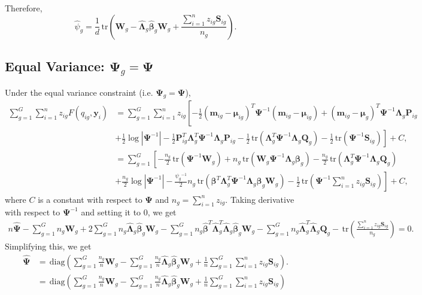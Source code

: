 \documentclass[12pt]{article}
\newcommand{\bP}{\mathbf{P}}
\newcommand{\bQ}{\mathbf{Q}}
\newcommand{\bW}{\mathbf{W}}
\newcommand{\bmm}{\mathbf{m}}
\newcommand{\by}{\mathbf{y}}
\newcommand{\bbeta}{\boldsymbol{\beta}}
\newcommand{\bmu}{\boldsymbol{\mu}}
\newcommand{\bLambda}{\boldsymbol{\Lambda}}
\newcommand{\bPsi}{\boldsymbol{\Psi}}
\newcommand{\tr}{\,\mbox{tr}}
\newcommand{\diag}{\,\mbox{diag}}
\begin{document}
Therefore,
\begin{equation}
\hat{\psi}_g=\frac{1}{d}\tr\left(\bW_g-\hat{\bLambda}_g\hat{\bbeta}_g\bW_g+\frac{\sum_{i=1}^nz_{ig}\mathbf{S}_{ig}}{n_g}\right).
\end{equation}

\subsection{Equal Variance: $\bPsi_g = \bPsi$}
Under the equal variance constraint (i.e. $\bPsi_g = \bPsi$),
\begin{align*}
\sum_{g=1}^G\sum_{i=1}^nz_{ig}F(q_{ig},\by_i)&=\sum_{g=1}^G\sum_{i=1}^nz_{ig}\left[-\frac{1}{2}(\bmm_{ig}-\bmu_{ig})^T\bPsi^{-1}(\bmm_{ig}-\bmu_{ig})+(\bmm_{ig}-\bmu_g)^T\bPsi^{-1}\bLambda_g\bP_{ig}  \right.\\
&\left.+\frac{1}{2} \log |\bPsi^{-1}|-\frac{1}{2}\bP_{ig}^T\bLambda_g^T\bPsi^{-1}\bLambda_g\bP_{ig}-\frac{1}{2}\tr(\bLambda_g^T\bPsi^{-1}\bLambda_g\bQ_{g})-\frac{1}{2}\tr\left(\bPsi^{-1}\mathbf{S}_{ig}\right)  \right]+C,\\[3pt]
&=\sum_{g=1}^G\left[-\frac{n_g}{2}\tr(\bPsi^{-1}\bW_{g})+n_g\tr(\bW_g\bPsi^{-1}\bLambda_g\bbeta_g)-\frac{n_g}{2}\tr(\bLambda_g^T\bPsi^{-1}\bLambda_g\bQ_{g})\right.\\
&\left.+\frac{n_g}{2}\log |\bPsi^{-1}|-\frac{\psi_g{^{-1}}}{2}n_g\tr(\bbeta^T\bLambda_g^T\bPsi^{-1}\bLambda_g\bbeta_g\bW_g)-\frac{1}{2}\tr\left(\bPsi^{-1}\sum_{i=1}^nz_{ig}\mathbf{S}_{ig}\right)\right]+C,
\end{align*}
where $C$ is a constant with respect to $\bPsi$ and $n_g=\sum_{i=1}^nz_{ig}$. Taking derivative with respect to $\bPsi^{-1}$ and setting it to 0, we get
\begin{align*}
n\hat{\bPsi}-\sum_{g=1}^Gn_g\bW_g+2\sum_{g=1}^Gn_g\hat{\bLambda}_g\hat{\bbeta}_g\bW_g-\sum_{g=1}^Gn_g\hat{\bbeta}^T\hat{\bLambda}_g^T\hat{\bLambda}_g\hat{\bbeta}_g\bW_g-\sum_{g=1}^Gn_g\hat{\bLambda}_g^T\hat{\bLambda}_g\bQ_{g}-\tr\left(\frac{\sum_{i=1}^nz_{ig}\mathbf{S}_{ig}}{n_g}\right)=0.
\end{align*}
Simplifying this, we get
\begin{align*}
\hat{\bPsi}&=\diag\left(\sum_{g=1}^G\frac{n_g}{n}\bW_g-\sum_{g=1}^G\frac{n_g}{n}\hat{\bLambda}_g\hat{\bbeta}_g\bW_g+\frac{1}{n}\sum_{g=1}^G\sum_{i=1}^nz_{ig}\mathbf{S}_{ig}\right).\\
&=\diag\left(\sum_{g=1}^G\frac{n_g}{n}\bW_g-\sum_{g=1}^G\frac{n_g}{n}\hat{\bLambda}_g\hat{\bbeta}_g\bW_g+\frac{1}{n}\sum_{g=1}^G\sum_{i=1}^nz_{ig}\mathbf{S}_{ig}\right)
\end{align*}
\end{document}
